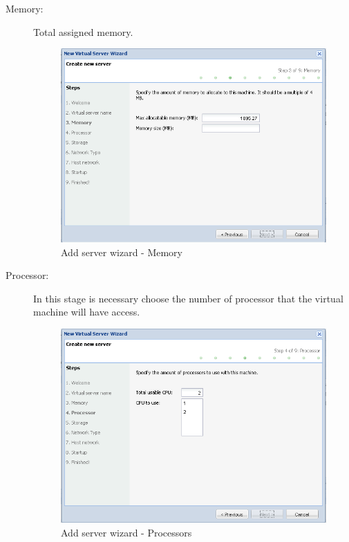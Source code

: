 \begin{description}
	\item[Memory:] Total assigned memory.
		\begin{figure}[H]
        		\begin{center}
		        \includegraphics[scale=0.5]{screenshots/server_createwiz_memory.png}
        		\caption{Add server wizard - Memory}
	        	\label{fig:server_createwiz_memory}
	        	\end{center}
		\end{figure}

	\item[Processor:] In this stage is necessary choose the number of processor that the virtual machine will have access.
		\begin{figure}[H]
        		\begin{center}
		        \includegraphics[scale=0.5]{screenshots/server_createwiz_processor.png}
        		\caption{Add server wizard - Processors}
		        \label{fig:server_createwiz_processor}
	        	\end{center}
		\end{figure}


\end{description}
